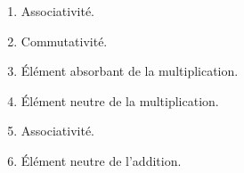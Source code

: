 %
%
    \begin{enumerate}
        \item Associativité.
        \item Commutativité.
        \item Élément absorbant de la multiplication.
        \item Élément neutre de la multiplication.
        \item Associativité.
        \item Élément neutre de l'addition.
    \end{enumerate}
